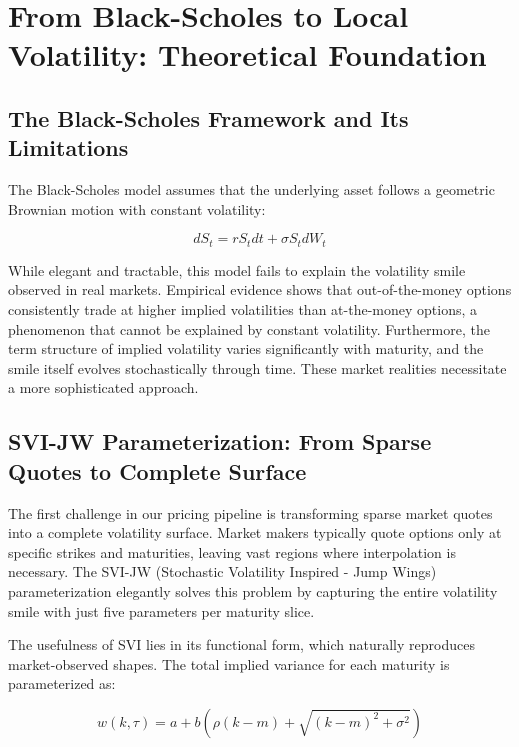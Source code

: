 \documentclass[11pt,a4paper]{article}
\begin{document}
\section{From Black-Scholes to Local Volatility: Theoretical Foundation}

\subsection{The Black-Scholes Framework and Its Limitations}

The Black-Scholes model \cite{Black1973} assumes that the underlying asset follows a geometric Brownian motion with constant volatility:

\begin{equation}
dS_t = rS_t dt + \sigma S_t dW_t
\end{equation}

While elegant and tractable, this model fails to explain the volatility smile observed in real markets. Empirical evidence shows that out-of-the-money options consistently trade at higher implied volatilities than at-the-money options, a phenomenon that cannot be explained by constant volatility. Furthermore, the term structure of implied volatility varies significantly with maturity, and the smile itself evolves stochastically through time. These market realities necessitate a more sophisticated approach.

\subsection{SVI-JW Parameterization: From Sparse Quotes to Complete Surface}

The first challenge in our pricing pipeline is transforming sparse market quotes into a complete volatility surface. Market makers typically quote options only at specific strikes and maturities, leaving vast regions where interpolation is necessary. The SVI-JW (Stochastic Volatility Inspired - Jump Wings) parameterization \cite{Gatheral2014} elegantly solves this problem by capturing the entire volatility smile with just five parameters per maturity slice.

The usefulness of SVI lies in its functional form, which naturally reproduces market-observed shapes. The total implied variance for each maturity is parameterized as:

\begin{equation}
w(k, \tau) = a + b\left(\rho(k - m) + \sqrt{(k - m)^2 + \sigma^2}\right)
\end{equation}
\end{document}
